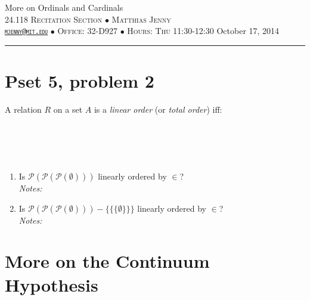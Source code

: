 \documentclass[justified]{tufte-handout}
\newcommand{\HRule}{\rule{\linewidth}{0.1mm}}
\begin{document}
\begin{fullwidth}
\noindent\LARGE More on Ordinals and Cardinals  \normalsize \\[.3cm]
\noindent  \textsc{24.118 Recitation Section $\bullet$ Matthias Jenny\\  {\texttt{\href{mailto:mjenny@mit.edu}{mjenny@mit.edu}}} $\bullet$ Office:  32-D927 $\bullet$ Hours: Thu 11:30-12:30} \hfill{October 17, 2014}
\noindent\HRule
\end{fullwidth}


\section{Pset 5, problem 2}

\noindent A relation $R$ on a set $A$ is a \emph{linear order} (or \emph{total order}) iff: \underline{\hspace{8.5cm}}\\\\\underline{\hspace{16.88cm}}\\\\\underline{\hspace{16.43cm}}\\


\begin{enumerate}[label=\alph*.]
\item Is $\mathcal{P}(\mathcal{P}(\mathcal{P}(\emptyset)))$ linearly ordered by $\in$?\\

\noindent \emph{Notes:}  \underline{\hspace{15.4cm}}\\

\item Is $\mathcal{P}(\mathcal{P}(\mathcal{P}(\emptyset)))-\{\{\{\emptyset\}\}\}$ linearly ordered by $\in$?\\

\noindent \emph{Notes:}  \underline{\hspace{15.4cm}}\\


\end{enumerate}


\section{More on the Continuum Hypothesis}
\end{document}
